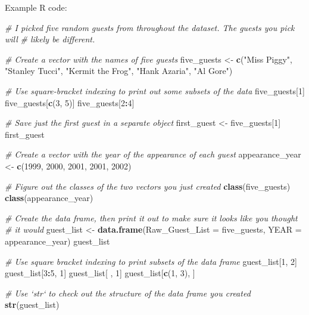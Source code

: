 \documentclass[]{book}
\makeatletter
\newenvironment{Shaded}{\begin{snugshade}}{\end{snugshade}}
\newcommand{\KeywordTok}[1]{\textcolor[rgb]{0.13,0.29,0.53}{\textbf{#1}}}
\newcommand{\DataTypeTok}[1]{\textcolor[rgb]{0.13,0.29,0.53}{#1}}
\newcommand{\DecValTok}[1]{\textcolor[rgb]{0.00,0.00,0.81}{#1}}
\newcommand{\StringTok}[1]{\textcolor[rgb]{0.31,0.60,0.02}{#1}}
\newcommand{\CommentTok}[1]{\textcolor[rgb]{0.56,0.35,0.01}{\textit{#1}}}
\newcommand{\OperatorTok}[1]{\textcolor[rgb]{0.81,0.36,0.00}{\textbf{#1}}}
\newcommand{\NormalTok}[1]{#1}
\newenvironment{kframe}{%
\medskip{}
\setlength{\fboxsep}{.8em}
 \def\at@end@of@kframe{}%
 \ifinner\ifhmode%
  \def\at@end@of@kframe{\end{minipage}}%
  \begin{minipage}{\columnwidth}%
 \fi\fi%
 \def\FrameCommand##1{\hskip\@totalleftmargin \hskip-\fboxsep
 \colorbox{shadecolor}{##1}\hskip-\fboxsep
     \hskip-\linewidth \hskip-\@totalleftmargin \hskip\columnwidth}%
 \MakeFramed {\advance\hsize-\width
   \@totalleftmargin\z@ \linewidth\hsize
   \@setminipage}}%
 {\par\unskip\endMakeFramed%
 \at@end@of@kframe}
\renewenvironment{Shaded}{\begin{kframe}}{\end{kframe}}
\theoremstyle{definition}
\theoremstyle{definition}
\theoremstyle{definition}
\theoremstyle{remark}
\makeatother
\begin{document}
Example R code:

\begin{Shaded}
\begin{Highlighting}[]
\CommentTok{# I picked five random guests from throughout the dataset. The guests you pick will }
\CommentTok{# likely be different.}

\CommentTok{# Create a vector with the names of five guests}
\NormalTok{five_guests <-}\StringTok{ }\KeywordTok{c}\NormalTok{(}\StringTok{"Miss Piggy"}\NormalTok{, }\StringTok{"Stanley Tucci"}\NormalTok{, }\StringTok{"Kermit the Frog"}\NormalTok{,}
                 \StringTok{"Hank Azaria"}\NormalTok{, }\StringTok{"Al Gore"}\NormalTok{)}

\CommentTok{# Use square-bracket indexing to print out some subsets of the data}
\NormalTok{five_guests[}\DecValTok{1}\NormalTok{]}
\NormalTok{five_guests[}\KeywordTok{c}\NormalTok{(}\DecValTok{3}\NormalTok{, }\DecValTok{5}\NormalTok{)]}
\NormalTok{five_guests[}\DecValTok{2}\OperatorTok{:}\DecValTok{4}\NormalTok{]}

\CommentTok{# Save just the first guest in a separate object}
\NormalTok{first_guest <-}\StringTok{ }\NormalTok{five_guests[}\DecValTok{1}\NormalTok{]}
\NormalTok{first_guest}

\CommentTok{# Create a vector with the year of the appearance of each guest}
\NormalTok{appearance_year <-}\StringTok{ }\KeywordTok{c}\NormalTok{(}\DecValTok{1999}\NormalTok{, }\DecValTok{2000}\NormalTok{, }\DecValTok{2001}\NormalTok{, }\DecValTok{2001}\NormalTok{, }\DecValTok{2002}\NormalTok{)}

\CommentTok{# Figure out the classes of the two vectors you just created}
\KeywordTok{class}\NormalTok{(five_guests)}
\KeywordTok{class}\NormalTok{(appearance_year)}

\CommentTok{# Create the data frame, then print it out to make sure it looks like you thought}
\CommentTok{# it would}
\NormalTok{guest_list <-}\StringTok{ }\KeywordTok{data.frame}\NormalTok{(}\DataTypeTok{Raw_Guest_List =}\NormalTok{ five_guests,}
                         \DataTypeTok{YEAR =}\NormalTok{ appearance_year)}
\NormalTok{guest_list}

\CommentTok{# Use square bracket indexing to print subsets of the data frame}
\NormalTok{guest_list[}\DecValTok{1}\NormalTok{, }\DecValTok{2}\NormalTok{]}
\NormalTok{guest_list[}\DecValTok{3}\OperatorTok{:}\DecValTok{5}\NormalTok{, }\DecValTok{1}\NormalTok{]}
\NormalTok{guest_list[ , }\DecValTok{1}\NormalTok{]}
\NormalTok{guest_list[}\KeywordTok{c}\NormalTok{(}\DecValTok{1}\NormalTok{, }\DecValTok{3}\NormalTok{), ]}

\CommentTok{# Use `str` to check out the structure of the data frame you created}
\KeywordTok{str}\NormalTok{(guest_list)}
\end{Highlighting}
\end{Shaded}
\end{document}
